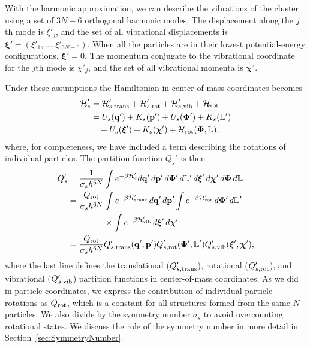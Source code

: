 \documentclass[pre, aps, twocolumn, reprint, amsmath,amssymb, showpacs,
superscriptaddress] {revtex4-1}
\begin{document}
With the harmonic approximation, we can describe the vibrations of the
cluster using a set of $3N-6$ orthogonal harmonic modes. The
displacement along the $j$th mode is $\xi'_j$, and the set of all
vibrational displacements is $\bm{\xi}'=(\xi'_1, \ldots, \xi'_{3N-6})$.
When all the particles are in their lowest potential-energy
configurations, $\bm{\xi}'=0$. The momentum conjugate to the vibrational
coordinate for the $j$th mode is $\chi'_j$, and the set of all
vibrational momenta is $\bm{\chi}'$.

Under these assumptions the Hamiltonian in center-of-mass coordinates
becomes
\begin{equation}\label{COM-Hamiltonian}
	\begin{split}
		\mathcal{H}_{s}'  & =  \mathcal{H}_{s, \textnormal{trans}}'+ 
    \mathcal{H}_{s, \textnormal{rot}}' + \mathcal{H}_{s, \textnormal{vib}}'
    + \mathcal{H}_\textnormal{rot} \\
    & = U_s(\mathbf{q}') + K_s(\mathbf{p}') + U_s(\bm{\Phi}') + K_s(\mathbb{L}')  \\
    & \quad + U_s(\bm{\xi}') + K_s(\bm{\chi}') + \mathcal{H}_\textnormal{rot} (\bm{\Phi}, \mathbb{L}),
  \end{split}
\end{equation}
where, for completeness, we have included a term describing the
rotations of individual particles. The partition function $Q_s'$ is then
\begin{equation}\label{COM-PartitionFunction}
	\begin{split}
    Q_{s}' = \frac{1}{\sigma_sh^{6N}} &\int {e^{-\beta \mathcal{H}_{s}'}} d \mathbf{q}' \, d\mathbf{p}' \, d\bm{\Phi}' \, d\mathbb{L}' \,
    d\bm{\xi}' \, d\bm{\chi}' \, d \bm{\Phi} \, d \mathbb{L} \\
          = \frac{Q_\textnormal{rot}}{\sigma_sh^{6N}} 
            &\int {e^{-\beta \mathcal{H}'_\textnormal{trans}}} \, d\mathbf{q}' \, d\mathbf{p}' 
            \int {e^{-\beta \mathcal{H}'_\textnormal{rot}}} \, d\bm{\Phi}' \, d\mathbb{L}'\\
            &\times\int {e^{-\beta \mathcal{H}'_\textnormal{vib}}} \, d\bm{\xi}' \, d\bm{\chi}' \\
        = \frac{Q_\textnormal{rot}}{\sigma_sh^{6N}} 
        & Q_{s, \textnormal{trans}}'(\mathbf{q}', \mathbf{p}') Q_{s, \textnormal{rot}}'(\bm{\Phi}', \mathbb{L}') Q_{s, \textnormal{vib}}'(\bm{\xi}', \bm{\chi}'),
	\end{split}
\end{equation}
where the last line defines the translational ($Q_{s,
  \textnormal{trans}}'$), rotational ($Q_{s, \textnormal{rot}}'$), and
vibrational ($Q_{s, \textnormal{vib}}'$) partition functions in
center-of-mass coordinates. As we did in particle coordinates, we
express the contribution of individual particle rotations as
$Q_{\textnormal{rot}}$, which is a constant for all structures formed
from the same $N$ particles. We also divide by the symmetry number
$\sigma_s$ to avoid overcounting rotational states. We discuss the role
of the symmetry number in more detail in
Section~\ref{sec:SymmetryNumber}.
\end{document}
